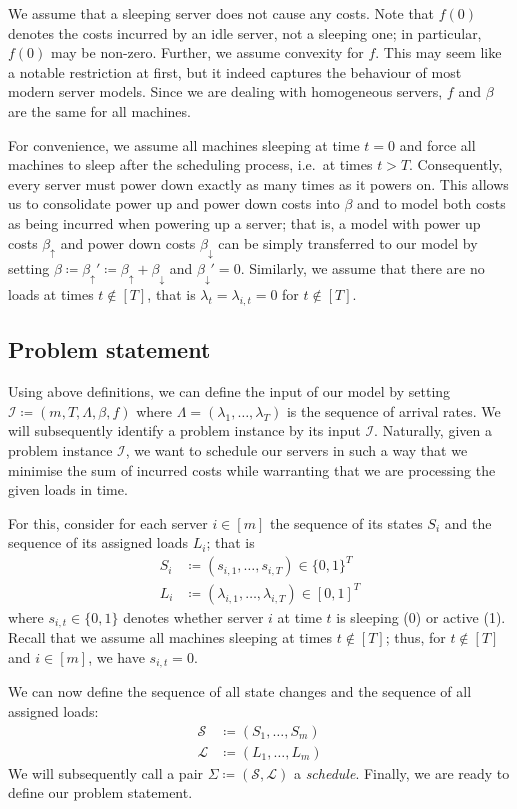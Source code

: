 \documentclass[hidelinks]{article}
\theoremstyle{plain}
\theoremstyle{definition}
\theoremstyle{rem}
\newcommand{\inp}{\mathcal{I}}
\begin{document}
We assume that a sleeping server does not cause any costs. Note that $f(0)$ denotes the costs incurred by an idle server, not a sleeping one; in particular, $f(0)$ may be non-zero. Further, we assume convexity for $f$. This may seem like a notable restriction at first, but it indeed captures the behaviour of most modern server models. Since we are dealing with homogeneous servers, $f$ and $\beta$ are the same for all machines.

For convenience, we assume all machines sleeping at time $t=0$ and force all machines to sleep after the scheduling process, i.e.\ at times $t>T$. Consequently, every server must power down exactly as many times as it powers on. This allows us to consolidate power up and power down costs into $\beta$ and to model both costs as being incurred when powering up a server; that is, a model with power up costs $\beta_\uparrow$ and power down costs $\beta_\downarrow$ can be simply transferred to our model by setting $\beta\coloneqq \beta_\uparrow'\coloneqq\beta_\uparrow+\beta_\downarrow$ and $\beta_\downarrow'=0$. Similarly, we assume that there are no loads at times $t\notin[T]$, that is $\lambda_t=\lambda_{i,t}=0$ for $t\notin[T]$.

\subsection{Problem statement}
Using above definitions, we can define the input of our model by setting $\inp\coloneqq(m,T,\Lambda,\beta,f)$ where $\Lambda=(\lambda_1,\ldots,\lambda_T)$ is the sequence of arrival rates. We will subsequently identify a problem instance by its input $\inp$. Naturally, given a problem instance $\inp$, we want to schedule our servers in such a way that we minimise the sum of incurred costs while warranting that we are processing the given loads in time.

For this, consider for each server $i\in[m]$ the sequence of its states $S_i$ and the sequence of its assigned loads $L_i$; that is
\begin{align*}
	S_i&\coloneqq(s_{i,1},\ldots,s_{i,T})\in\{0,1\}^T\\
	L_i&\coloneqq(\lambda_{i,1},\ldots,\lambda_{i,T})\in[0,1]^T
\end{align*}
where $s_{i,t}\in\{0,1\}$ denotes whether server $i$ at time $t$ is sleeping (0) or active (1). Recall that we assume all machines sleeping at times $t\notin[T]$; thus, for $t\notin[T]$ and $i\in[m]$, we have $s_{i,t}=0$.

We can now define the sequence of all state changes and the sequence of all assigned loads:
\begin{align*}
	\mathcal{S}&\coloneqq(S_1,\ldots,S_m)\\
	\mathcal{L}&\coloneqq(L_1,\ldots,L_m)
\end{align*}
We will subsequently call a pair $\Sigma\coloneqq(\mathcal{S},\mathcal{L})$ a \textit{schedule}. Finally, we are ready to define our problem statement.
\end{document}
